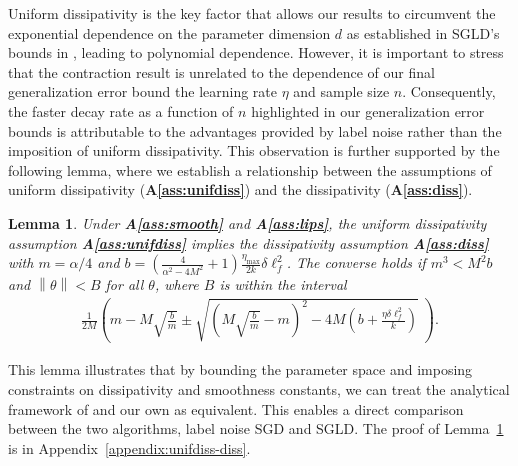 \documentclass{article}
\newcommand{\norm}[1]{\left\lVert#1\right\rVert} %
\newtheorem{lemma}{Lemma}
\begin{document}
Uniform dissipativity is the key factor that allows our results to circumvent the exponential dependence on the parameter dimension $d$ as established in SGLD's bounds in \citet{Farghly}, leading to  polynomial dependence. However, it is important to stress that the contraction result is unrelated to the dependence of our final generalization error bound the learning rate $\eta$ and sample size $n$. Consequently, the faster decay rate as a function of $n$ highlighted in our generalization error bounds is attributable to the advantages provided by label noise rather than the imposition of uniform dissipativity. This observation is further supported by the following lemma, where we establish a relationship between the assumptions of uniform dissipativity (\textbf{A\ref{ass:unifdiss}}) and the dissipativity (\textbf{A\ref{ass:diss}}).

\begin{lemma}\label{lemma:twodiss}
    Under \textbf{A\ref{ass:smooth}} and \textbf{A\ref{ass:lips}}, the uniform dissipativity assumption \textbf{A\ref{ass:unifdiss}} implies the dissipativity assumption \textbf{A\ref{ass:diss}} with $m=\alpha/4$ and $b = \left(\frac{4}{\alpha^2 - 4M^2} +1 \right) \frac{\eta_{\max}}{2k} \delta \ell_f^2$. The converse holds if $m^3 < M^2 b$ and $\norm{\theta} < B$ for all $\theta$, where $B$ is within the interval
    \begin{align*}
        \frac{1}{2M}\!\left(\!m\!-\!M\!\sqrt{\frac{b}{m}}\!\pm\!\sqrt{\!\left(\!M\!\sqrt{\frac{b}{m}}\!-\!m\!\right)^2\!\!\!\!-\!4M\!\left(\!b\!+\!\frac{\eta\delta\ell_f^2}{k} \!\right)}\;\right).     
    \end{align*}
\end{lemma}

This lemma illustrates that by bounding the parameter space and imposing constraints on dissipativity and smoothness constants, we can treat the analytical framework of \citet{Farghly} and our own as equivalent. This enables a direct comparison between the two algorithms, label noise SGD and SGLD. The proof of Lemma~\ref{lemma:twodiss} is in Appendix~\ref{appendix:unifdiss-diss}.
\end{document}
